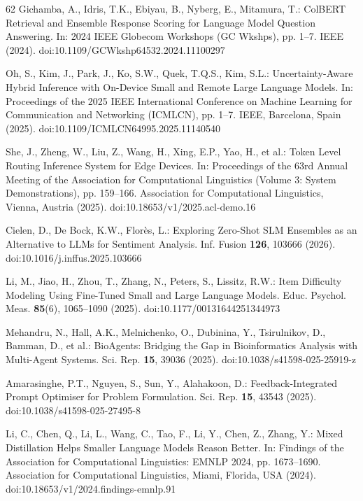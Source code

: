 \begin{thebibliography}{62}
Gichamba, A., Idris, T.K., Ebiyau, B., Nyberg, E., Mitamura, T.: ColBERT Retrieval and Ensemble Response Scoring for Language Model Question Answering. In: 2024 IEEE Globecom Workshops (GC Wkshps), pp. 1--7. IEEE (2024). doi:10.1109/GCWkshp64532.2024.11100297

Oh, S., Kim, J., Park, J., Ko, S.W., Quek, T.Q.S., Kim, S.L.: Uncertainty-Aware Hybrid Inference with On-Device Small and Remote Large Language Models. In: Proceedings of the 2025 IEEE International Conference on Machine Learning for Communication and Networking (ICMLCN), pp. 1--7. IEEE, Barcelona, Spain (2025). doi:10.1109/ICMLCN64995.2025.11140540

She, J., Zheng, W., Liu, Z., Wang, H., Xing, E.P., Yao, H., et al.: Token Level Routing Inference System for Edge Devices. In: Proceedings of the 63rd Annual Meeting of the Association for Computational Linguistics (Volume 3: System Demonstrations), pp. 159--166. Association for Computational Linguistics, Vienna, Austria (2025). doi:10.18653/v1/2025.acl-demo.16

Cielen, D., De Bock, K.W., Florès, L.: Exploring Zero-Shot SLM Ensembles as an Alternative to LLMs for Sentiment Analysis. Inf. Fusion \textbf{126}, 103666 (2026). doi:10.1016/j.inffus.2025.103666

Li, M., Jiao, H., Zhou, T., Zhang, N., Peters, S., Lissitz, R.W.: Item Difficulty Modeling Using Fine-Tuned Small and Large Language Models. Educ. Psychol. Meas. \textbf{85}(6), 1065--1090 (2025). doi:10.1177/00131644251344973

Mehandru, N., Hall, A.K., Melnichenko, O., Dubinina, Y., Tsirulnikov, D., Bamman, D., et al.: BioAgents: Bridging the Gap in Bioinformatics Analysis with Multi-Agent Systems. Sci. Rep. \textbf{15}, 39036 (2025). doi:10.1038/s41598-025-25919-z

Amarasinghe, P.T., Nguyen, S., Sun, Y., Alahakoon, D.: Feedback-Integrated Prompt Optimiser for Problem Formulation. Sci. Rep. \textbf{15}, 43543 (2025). doi:10.1038/s41598-025-27495-8

Li, C., Chen, Q., Li, L., Wang, C., Tao, F., Li, Y., Chen, Z., Zhang, Y.: Mixed Distillation Helps Smaller Language Models Reason Better. In: Findings of the Association for Computational Linguistics: EMNLP 2024, pp. 1673--1690. Association for Computational Linguistics, Miami, Florida, USA (2024). doi:10.18653/v1/2024.findings-emnlp.91

\end{thebibliography}
